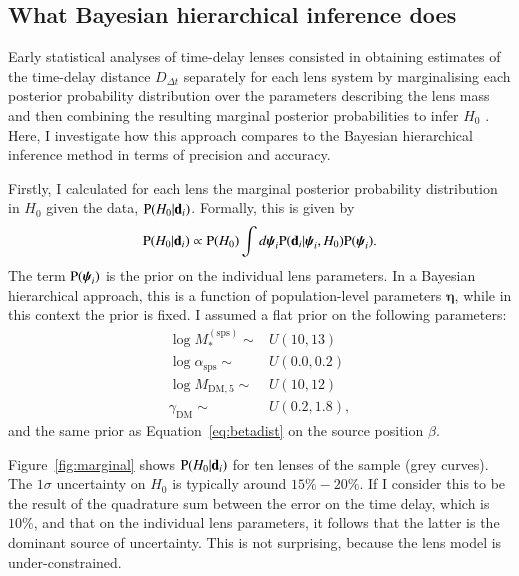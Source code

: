 \documentclass{aa}
\def\ddt{D_{\Delta t}}
\def\msps{M_*^{\mathrm{(sps)}}}
\def\mfive{M_{\mathrm{DM},5}}
\def\gammadm{\gamma_{\mathrm{DM}}}
\def\asps{\alpha_{\mathrm{sps}}}
\def\hyperpars{\boldsymbol{\eta}}
\def\indpari{\boldsymbol{\psi}_i}
\def\datai{\mathbf{d}_i}
\def\Fref#1{Figure~\ref{#1}\xspace}
\def\Eref#1{Equation~\ref{#1}\xspace}
\def\pr{{\rm P}}
\begin{document}
\subsection{What Bayesian hierarchical inference does}\label{ssec:whatbayes}

Early statistical analyses of time-delay lenses \citep[that is, prior to the][ study]{Bir++20} consisted in obtaining estimates of the time-delay distance $\ddt$ separately for each lens system by marginalising each posterior probability distribution over the parameters describing the lens mass and then combining the resulting marginal posterior probabilities to infer $H_0$ \citep[see e.g.][]{Bon++17}.
Here, I investigate how this approach compares to the Bayesian hierarchical inference method in terms of precision and accuracy.

Firstly, I calculated for each lens the marginal posterior probability distribution in $H_0$ given the data, $\pr(H_0|\datai)$. Formally, this is given by
\begin{equation}\label{eq:onelensh0}
\pr(H_0|\datai) \propto \pr(H_0)\int d\indpari \pr(\datai|\indpari,H_0)\pr(\indpari).
\end{equation}
The term $\pr(\indpari)$ is the prior on the individual lens parameters. In a Bayesian hierarchical approach, this is a function of population-level parameters $\hyperpars$, while in this context the prior is fixed. I assumed a flat prior on the following parameters:
\begin{align}
\log{\msps} \sim & U(10,13) \nonumber \\
\log{\asps} \sim & U(0.0, 0.2) \label{eq:flatpriors} \\
\log{\mfive} \sim & U(10,12) \nonumber \\
\gammadm \sim & U(0.2, 1.8), \nonumber
\end{align}
and the same prior as \Eref{eq:betadist} on the source position $\beta$.

\Fref{fig:marginal} shows $\pr(H_0|\datai)$ for ten lenses of the sample (grey curves). The $1\sigma$ uncertainty on $H_0$ is typically around $15\%-20\%$. 
If I consider this to be the result of the quadrature sum between the error on the time delay, which is $10\%$, and that on the individual lens parameters, it follows that the latter is the dominant source of uncertainty. This is not surprising, because the lens model is under-constrained.
\end{document}
